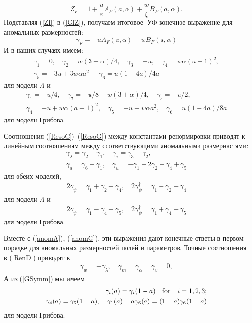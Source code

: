 \documentclass[a4paper,10pt]{article}
\begin{document}
\begin{equation}
Z_{F} = 1 + \frac{u}{\varepsilon} A_{F}(a,\alpha) + \frac{w}{\xi} B_{F}(a,\alpha).
\label{Zf}
\end{equation}
Подставляя (\ref{Zf}) в (\ref{GfZ}), получаем итоговое, УФ конечное выражение для аномальных размерностей:
\begin{equation}
\gamma_{F} = - u A_{F}(a,\alpha) - w B_{F}(a,\alpha)
\label{gift}
\end{equation}
 И в наших случаях имеем:
\begin{eqnarray}
\gamma_{1} = 0, \quad \gamma_{2} = w (3+\alpha)/4, \quad
\gamma_{3} = -u , \quad \gamma_{4} =w \alpha (a-1)^{2} , \nonumber \\
\gamma_{5} =  -3u +3 w \alpha a^{2}, \quad
\gamma_{6} =u(1-4a)/4a
\label{anomA}
\end{eqnarray}
для модели {\it A} и
\begin{eqnarray}
\gamma_{1} = -u/4 , \quad \gamma_{2} = -u/8 + w (3+\alpha)/4, \quad
\gamma_{3} = -u/2 , \nonumber \\
\gamma_{4} = -u + w \alpha (a-1)^{2}, \quad
\gamma_{5} = -u + w \alpha a^{2}, \quad
\gamma_{6} =u(1-4a)/8a
\label{anomG}
\end{eqnarray}
для модели Грибова.

Соотношения (\ref{ResoC})--(\ref{ResoG})
между константами ренормировки приводят к линейным соотношениям между соответствующими аномальными размернастями:
\begin{eqnarray}
\gamma_{\lambda} =  \gamma_{2} -\gamma_{1}, \quad
\gamma_{\tau} =  \gamma_{3} -\gamma_{2} , \nonumber \\
\gamma_{a} =  \gamma_{6} -\gamma_{1}, \quad
\gamma_{u} = -\gamma_{1}- 2\gamma_{2} +\gamma_{4} + \gamma_{5}
\label{aesoC}
\end{eqnarray}
для обеих моделей,
\begin{eqnarray}
2\gamma_{\psi}= \gamma_{1} +\gamma_{2} -\gamma_{4}, \quad
2\gamma_{\psi}^{\dag}= \gamma_{1} - \gamma_{2} + \gamma_{4}
\label{aesoA}
\end{eqnarray}
для модели {\it A} и
\begin{eqnarray}
2\gamma_{\psi}= \gamma_{1}- \gamma_{4} + \gamma_{5}, \quad
2\gamma_{\psi}^{\dag}= \gamma_{1}+ \gamma_{4} -  \gamma_{5}
\label{aesoG}
\end{eqnarray}
для модели Грибова.
 
Вместе с (\ref{anomA}), (\ref{anomG}), эти выражения дают конечные ответы в первом порядке для аномальных размерностей  полей и параметров.
Точные соотношения в  (\ref{RenD}) приводят к
\begin{eqnarray}
\gamma_{w} =-\gamma_{\lambda}, \quad
\gamma_{m} =\gamma_{\alpha} =\gamma_{v} = 0,
\label{exi}
\end{eqnarray}
А из (\ref{GSymm}) мы имеем 
\begin{eqnarray}
\gamma_{i} (a) = \gamma_{i} (1-a) \quad {\rm for} \quad i=1,2,3;
\nonumber \\
\gamma_{4} (a) = \gamma_{5} (1-a), \quad
\gamma_{1} (a) -a \gamma_{6}(a) = (1-a) \gamma_{6}(1-a)
\label{SymmG}
\end{eqnarray}
для модели Грибова.
\end{document}
